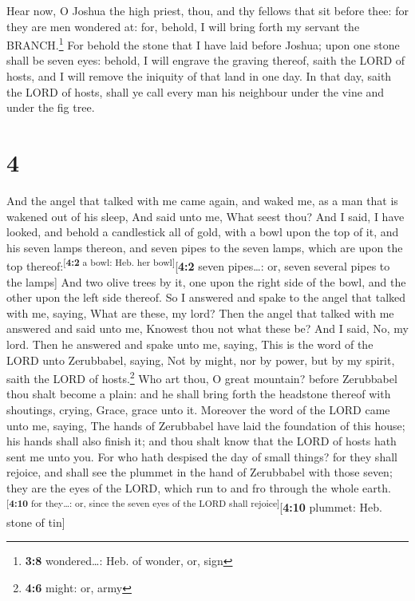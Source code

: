  Hear now, O Joshua the high priest, thou, and thy fellows
that sit before thee: for they are men wondered at: for, behold, I will
bring forth my servant the BRANCH.\footnote{\textbf{3:8} wondered\ldots:
  Heb. of wonder, or, sign}  For behold the stone that I
have laid before Joshua; upon one stone shall be seven eyes: behold, I
will engrave the graving thereof, saith the LORD of hosts, and I will
remove the iniquity of that land in one day.  In that
day, saith the LORD of hosts, shall ye call every man his neighbour
under the vine and under the fig tree.

\hypertarget{section-3}{%
\section{4}\label{section-3}}

 And the angel that talked with me came again, and waked
me, as a man that is wakened out of his sleep,  And said
unto me, What seest thou? And I said, I have looked, and behold a
candlestick all of gold, with a bowl upon the top of it, and his seven
lamps thereon, and seven pipes to the seven lamps, which are upon the
top thereof:\textsuperscript{{[}\textbf{4:2} a bowl: Heb. her
bowl{]}}{[}\textbf{4:2} seven pipes\ldots: or, seven several pipes to
the lamps{]}  And two olive trees by it, one upon the
right side of the bowl, and the other upon the left side thereof.
 So I answered and spake to the angel that talked with me,
saying, What are these, my lord?  Then the angel that
talked with me answered and said unto me, Knowest thou not what these
be? And I said, No, my lord.  Then he answered and spake
unto me, saying, This is the word of the LORD unto Zerubbabel, saying,
Not by might, nor by power, but by my spirit, saith the LORD of
hosts.\footnote{\textbf{4:6} might: or, army}  Who art
thou, O great mountain? before Zerubbabel thou shalt become a plain: and
he shall bring forth the headstone thereof with shoutings, crying,
Grace, grace unto it.  Moreover the word of the LORD came
unto me, saying,  The hands of Zerubbabel have laid the
foundation of this house; his hands shall also finish it; and thou shalt
know that the LORD of hosts hath sent me unto you.  For
who hath despised the day of small things? for they shall rejoice, and
shall see the plummet in the hand of Zerubbabel with those seven; they
are the eyes of the LORD, which run to and fro through the whole
earth.\textsuperscript{{[}\textbf{4:10} for they\ldots: or, since the
seven eyes of the LORD shall rejoice{]}}{[}\textbf{4:10} plummet: Heb.
stone of tin{]}

